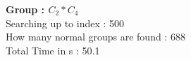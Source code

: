 \textbf{Group : $C_2*C_4$}\\
Searching up to index : 500\\
How many normal groups are found : 688\\
Total Time in s : 50.1\\
